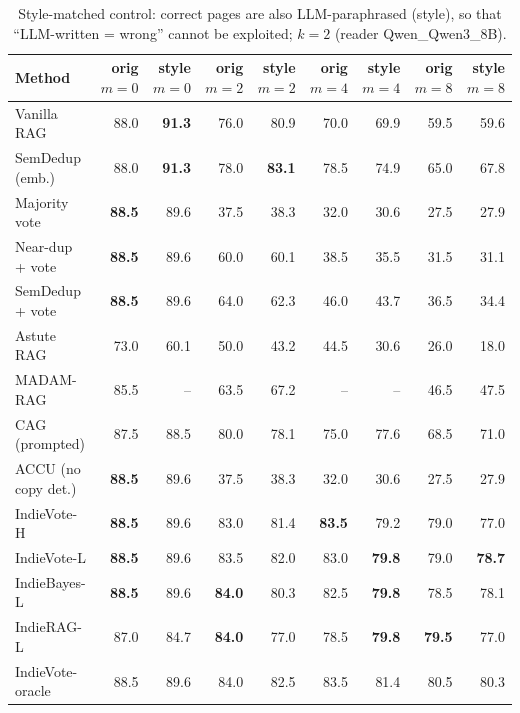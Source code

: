 \begin{table}[tbp]
\centering
\small
\caption{Style-matched control: correct pages are also LLM-paraphrased (style), so that ``LLM-written = wrong'' cannot be exploited; $k{=}2$ (reader Qwen\_Qwen3\_8B).}
\label{tab:style:Qwen_Qwen3_8B}
\setlength{\tabcolsep}{4pt}
\begin{tabular}{lrrrrrrrr}
\toprule
Method & orig $m{=}0$ & style $m{=}0$ & orig $m{=}2$ & style $m{=}2$ & orig $m{=}4$ & style $m{=}4$ & orig $m{=}8$ & style $m{=}8$ \\
\midrule
Vanilla RAG & 88.0 & \textbf{91.3} & 76.0 & 80.9 & 70.0 & 69.9 & 59.5 & 59.6 \\
SemDedup (emb.) & 88.0 & \textbf{91.3} & 78.0 & \textbf{83.1} & 78.5 & 74.9 & 65.0 & 67.8 \\
Majority vote & \textbf{88.5} & 89.6 & 37.5 & 38.3 & 32.0 & 30.6 & 27.5 & 27.9 \\
Near-dup + vote & \textbf{88.5} & 89.6 & 60.0 & 60.1 & 38.5 & 35.5 & 31.5 & 31.1 \\
SemDedup + vote & \textbf{88.5} & 89.6 & 64.0 & 62.3 & 46.0 & 43.7 & 36.5 & 34.4 \\
Astute RAG & 73.0 & 60.1 & 50.0 & 43.2 & 44.5 & 30.6 & 26.0 & 18.0 \\
MADAM-RAG & 85.5 & -- & 63.5 & 67.2 & -- & -- & 46.5 & 47.5 \\
CAG (prompted) & 87.5 & 88.5 & 80.0 & 78.1 & 75.0 & 77.6 & 68.5 & 71.0 \\
ACCU (no copy det.) & \textbf{88.5} & 89.6 & 37.5 & 38.3 & 32.0 & 30.6 & 27.5 & 27.9 \\
IndieVote-H & \textbf{88.5} & 89.6 & 83.0 & 81.4 & \textbf{83.5} & 79.2 & 79.0 & 77.0 \\
IndieVote-L & \textbf{88.5} & 89.6 & 83.5 & 82.0 & 83.0 & \textbf{79.8} & 79.0 & \textbf{78.7} \\
IndieBayes-L & \textbf{88.5} & 89.6 & \textbf{84.0} & 80.3 & 82.5 & \textbf{79.8} & 78.5 & 78.1 \\
IndieRAG-L & 87.0 & 84.7 & \textbf{84.0} & 77.0 & 78.5 & \textbf{79.8} & \textbf{79.5} & 77.0 \\
IndieVote-oracle & 88.5 & 89.6 & 84.0 & 82.5 & 83.5 & 81.4 & 80.5 & 80.3 \\
\bottomrule
\end{tabular}
\end{table}
